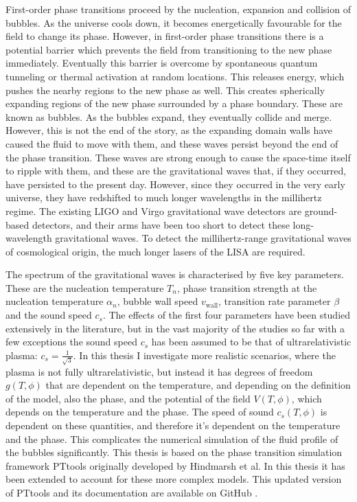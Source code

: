 First-order phase transitions proceed by the nucleation, expansion and collision of bubbles.
As the universe cools down,
it becomes energetically favourable for the field to change its phase.
However, in first-order phase transitions there is a potential barrier which prevents the field from transitioning to the new phase immediately.
Eventually this barrier is overcome by spontaneous quantum tunneling or thermal activation at random locations.
This releases energy, which pushes the nearby regions to the new phase as well.
This creates spherically expanding regions of the new phase surrounded by a phase boundary.
These are known as bubbles.
As the bubbles expand, they eventually collide and merge.
However, this is not the end of the story,
as the expanding domain walls have caused the fluid to move with them,
and these waves persist beyond the end of the phase transition.
These waves are strong enough to cause the space-time itself to ripple with them,
and these are the gravitational waves that, if they occurred, have persisted to the present day.
However, since they occurred in the very early universe, they have redshifted to much longer wavelengths in the millihertz regime.
The existing LIGO and Virgo gravitational wave detectors are ground-based detectors,
and their arms have been too short to detect these long-wavelength gravitational waves.
To detect the millihertz-range gravitational waves of cosmological origin, the much longer lasers of the LISA are required.
\cites{lecture_notes}{hindmarsh_gw_pt_2019}{mazumdar_review_2019}

The spectrum of the gravitational waves is characterised by five key parameters.
These are the nucleation temperature $T_n$,
phase transition strength at the nucleation temperature $\alpha_n$,
bubble wall speed $v_{\text{wall}}$,
transition rate parameter $\beta$
and the sound speed $c_s$.
\cite{lecture_notes}
The effects of the first four parameters have been studied extensively in the literature,
but in the vast majority of the studies so far with a few exceptions
\cites{leitao_hydrodynamics_2015}{giese_2020}{giese_2021}{tenkanen_speed_2022}{tian_gw_2024}
the sound speed $c_s$ has been assumed to be that of ultrarelativistic plasma: $c_s = \frac{1}{\sqrt{3}}$.
In this thesis I investigate more realistic scenarios, where the plasma is not fully ultrarelativistic,
but instead it has degrees of freedom $g(T,\phi)$ that are dependent on the temperature,
and depending on the definition of the model, also the phase,
and the potential of the field $V(T,\phi)$,
which depends on the temperature and the phase.
The speed of sound $c_s(T,\phi)$ is dependent on these quantities,
and therefore it's dependent on the temperature and the phase.
This complicates the numerical simulation of the fluid profile of the bubbles significantly.
\cites{leitao_hydrodynamics_2015}{giese_2020}{giese_2021}
This thesis is based on the phase transition simulation framework PTtools originally developed by Hindmarsh et al.
In this thesis it has been extended to account for these more complex models.
This updated version of PTtools and its documentation are available on GitHub \cite{pttools}.


